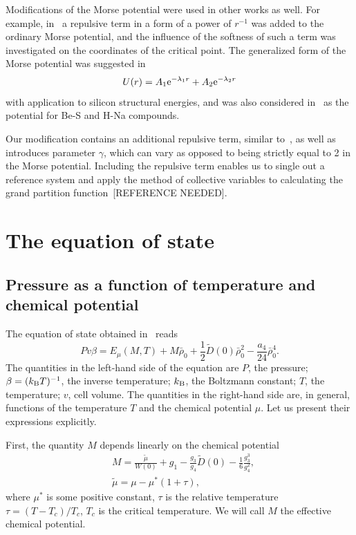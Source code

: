 \documentclass[12pt]{article}
\begin{document}
	Modifications of the Morse potential were used in other works as well. For example, in~\cite{MartinezValenciaEtAl2013} a repulsive term in a form of a power of $r^{-1}$ was added to the ordinary Morse potential, and the influence of the softness of such a term was investigated on the coordinates of the critical point. The generalized form of the Morse potential was suggested in~\cite{BiswasHamann1985}
	\begin{equation}
		U(r) = A_1 {\rm e}^{-\lambda_1 r} + A_2 {\rm e}^{-\lambda_2 r}
	\end{equation} 
	with application to silicon structural energies, and was also considered in~\cite{Lim2005} as the potential for Be-S and H-Na compounds.
	
	Our modification contains an additional repulsive term, similar to~\cite{MartinezValenciaEtAl2013}, as well as introduces parameter $\gamma$, which can vary as opposed to being strictly equal to 2 in the Morse potential. Including the repulsive term enables us to single out a reference system and apply the method of collective variables to calculating the grand partition function~[REFERENCE NEEDED].
	
	\section{The equation of state}
	\subsection{Pressure as a function of temperature and chemical potential}
	The equation of state obtained in~\cite[see Eq.(42)]{KozlovskiiDobush2020} reads
	\begin{equation}
		\label{eq:eosMT}
		Pv\beta = E_\mu(M, T) + M \bar \rho_0 + \frac{1}{2} \tilde D(0) \bar \rho_0^2 - \frac{a_4}{24} \bar \rho_0^4.
	\end{equation}
	The quantities in the left-hand side of the equation are $P$, the pressure; $\beta = (k_{\rm B} T)^{-1}$, the inverse temperature; $k_{\rm B}$, the Boltzmann constant; $T$, the temperature; $v$, cell volume. The quantities in the right-hand side are, in general, functions of the temperature $T$ and the chemical potential $\mu$. Let us present their expressions explicitly.
	
	First, the quantity $M$ depends linearly on the chemical potential
	\begin{align}\label{chem_pot}
		&	M = \frac{\tilde\mu}{W(0)} + g_1 - \frac{g_3}{g_4} \tilde D(0) - \frac{1}{6} \frac{g_3^3}{g_4^2}, \\
		&	\tilde\mu=\mu-\mu^*(1+\tau),
	\end{align}
	where $\mu^*$ is some positive constant, $\tau$ is the relative temperature $\tau = (T - T_c) / T_c$, $T_c$ is the critical temperature. We will call $M$ the effective chemical potential.
	
\end{document}

